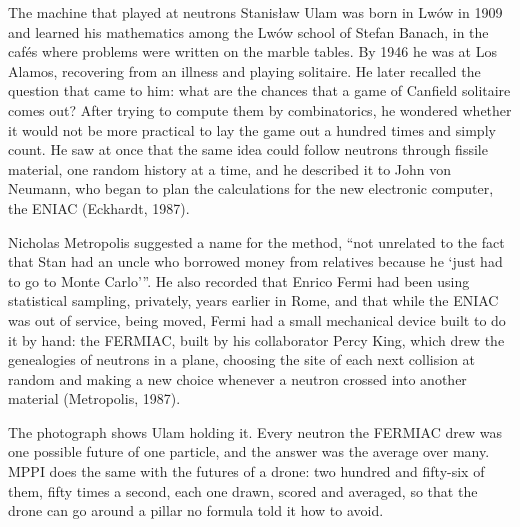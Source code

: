 \begin{curiosity}{The machine that played at neutrons}
Stanisław Ulam was born in Lwów in 1909 and learned his mathematics among the Lwów school of Stefan Banach, in the cafés where problems were written on the marble tables. By 1946 he was at Los Alamos, recovering from an illness and playing solitaire. He later recalled the question that came to him: what are the chances that a game of Canfield solitaire comes out? After trying to compute them by combinatorics, he wondered whether it would not be more practical to lay the game out a hundred times and simply count. He saw at once that the same idea could follow neutrons through fissile material, one random history at a time, and he described it to John von Neumann, who began to plan the calculations for the new electronic computer, the ENIAC (Eckhardt, 1987).

Nicholas Metropolis suggested a name for the method, \enquote{not unrelated to the fact that Stan had an uncle who borrowed money from relatives because he \enquote{just had to go to Monte Carlo}}. He also recorded that Enrico Fermi had been using statistical sampling, privately, years earlier in Rome, and that while the ENIAC was out of service, being moved, Fermi had a small mechanical device built to do it by hand: the FERMIAC, built by his collaborator Percy King, which drew the genealogies of neutrons in a plane, choosing the site of each next collision at random and making a new choice whenever a neutron crossed into another material (Metropolis, 1987).

The photograph shows Ulam holding it. Every neutron the FERMIAC drew was one possible future of one particle, and the answer was the average over many. MPPI does the same with the futures of a drone: two hundred and fifty-six of them, fifty times a second, each one drawn, scored and averaged, so that the drone can go around a pillar no formula told it how to avoid.
\end{curiosity}

